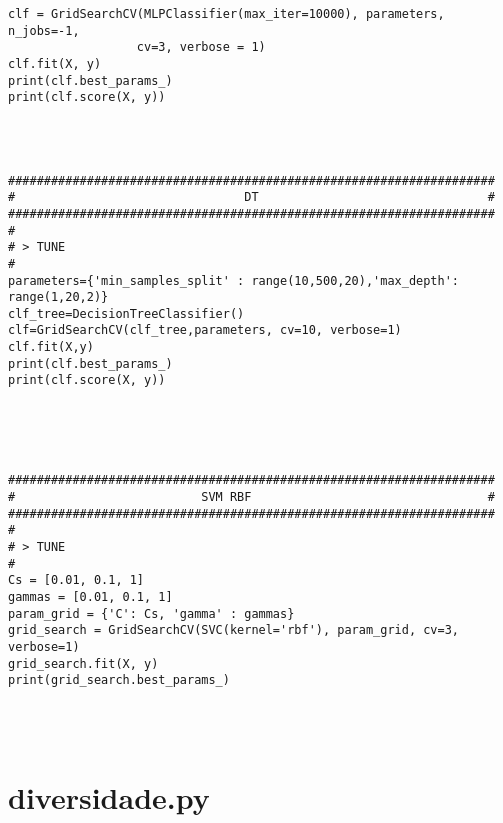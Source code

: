 \begin{verbatim}
clf = GridSearchCV(MLPClassifier(max_iter=10000), parameters, n_jobs=-1, 
                  cv=3, verbose = 1)
clf.fit(X, y)
print(clf.best_params_)
print(clf.score(X, y))




####################################################################
#                                DT                                #
####################################################################
#
# > TUNE
#
parameters={'min_samples_split' : range(10,500,20),'max_depth': range(1,20,2)}
clf_tree=DecisionTreeClassifier()
clf=GridSearchCV(clf_tree,parameters, cv=10, verbose=1)
clf.fit(X,y)
print(clf.best_params_)
print(clf.score(X, y))





####################################################################
#                          SVM RBF                                 #
####################################################################
#
# > TUNE
#
Cs = [0.01, 0.1, 1]
gammas = [0.01, 0.1, 1]
param_grid = {'C': Cs, 'gamma' : gammas}
grid_search = GridSearchCV(SVC(kernel='rbf'), param_grid, cv=3, verbose=1)
grid_search.fit(X, y)
print(grid_search.best_params_)




\end{verbatim}
\chapter{diversidade.py}
\label{apendice_diversidade}

